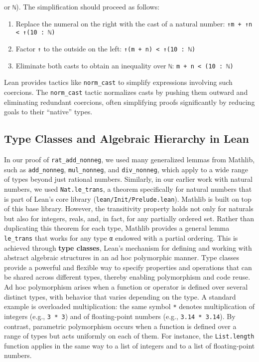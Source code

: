 or \lstinline[language=lean]|ℕ|). The simplification should proceed as follows:
\begin{enumerate}
  \item Replace the numeral on the right with the cast of a natural number:
        \lstinline[language=lean]|↑m + ↑n < ↑(10 : ℕ)|
  \item Factor \lstinline[language=lean]|↑| to the outside on the left:
        \lstinline[language=lean]|↑(m + n) < ↑(10 : ℕ)|
  \item Eliminate both casts to obtain an inequality over \lstinline[language=lean]|ℕ|:
        \lstinline[language=lean]|m + n < (10 : ℕ)|
\end{enumerate}
Lean provides tactics like \lstinline[language=lean]|norm_cast|
to simplify expressions involving such coercions.
The \lstinline[language=lean]|norm_cast| tactic normalizes casts
by pushing them outward and eliminating redundant coercions, often simplifying
proofs significantly by reducing goals to their ``native'' types.

\subsection{Type Classes and Algebraic Hierarchy in Lean}

In our proof of \lstinline[language=lean]|rat_add_nonneg|,
we used many generalized lemmas from Mathlib, such as \lstinline[language=lean]|add_nonneg|,
\lstinline[language=lean]|mul_nonneg|, and \lstinline[language=lean]|div_nonneg|,
which apply to a wide range of types beyond just rational numbers.
Similarly, in our earlier work with natural numbers, we used \lstinline[language=lean]|Nat.le_trans|,
a theorem specifically for natural numbers that is part of Lean's core library
(\texttt{lean/Init/Prelude.lean}). Mathlib is built on top of this base library.
However, the transitivity property holds not only for naturals but also for integers,
reals, and, in fact, for any partially ordered set.
Rather than duplicating this theorem for each type, Mathlib provides a general
lemma \lstinline[language=lean]|le_trans| that works for any type \lstinline[language=lean]|α|
endowed with a partial ordering.
This is achieved through \textbf{type classes}, Lean's mechanism for defining and working with
abstract algebraic structures in an ad hoc polymorphic manner.
Type classes provide a powerful and flexible way to specify properties and operations that can be
shared across different types, thereby enabling polymorphism and code reuse. Ad hoc polymorphism
arises when a function or operator is defined over several distinct types, with behavior that varies
depending on the type.
A standard example \cite{wadler_blott_ad_hoc_polymorphism_1988} is overloaded multiplication:
the same symbol \lstinline[language=lean]|*| denotes multiplication of integers
(e.g., \lstinline[language=lean]|3 * 3|) and of floating-point numbers
(e.g., \lstinline[language=lean]|3.14 * 3.14|).
By contrast, parametric polymorphism occurs when a function is defined over a range of types
but acts uniformly on each of them. For instance, the \lstinline[language=lean]|List.length|
function applies in the same way to a list of integers and to a list of floating-point numbers.

